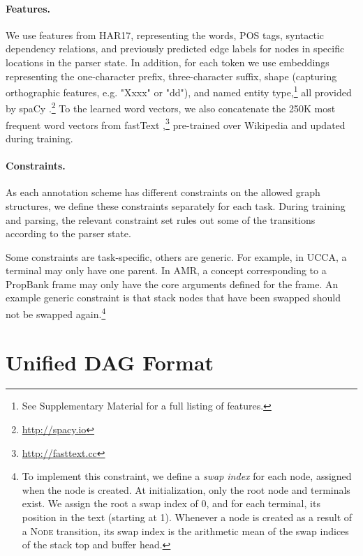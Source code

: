 \documentclass[11pt,a4paper]{article}
\begin{document}
\paragraph{Features.}
We use features from HAR17,
representing the words, POS tags, syntactic dependency relations, and previously predicted edge labels
for nodes in specific locations in the parser state.
In addition, for each token
we use embeddings representing the one-character prefix, three-character suffix,
shape (capturing orthographic features, e.g. "Xxxx" or "dd"),
and named entity type,\footnote{See Supplementary Material for a full listing of features.}
all provided by spaCy \cite{spacy2}.\footnote{\url{http://spacy.io}}
To the learned word vectors, we also concatenate the 250K most frequent word vectors from fastText
\cite{bojanowski2016enriching},\footnote{\url{http://fasttext.cc}}
pre-trained over Wikipedia and updated during training.


\paragraph{Constraints.}
As each annotation scheme has different constraints on the allowed graph structures,
we define these constraints separately for each task.
During training and parsing, the relevant constraint set rules out some of the transitions
according to the parser state.


Some constraints are task-specific, others are generic.
For example, in UCCA, a terminal may only have one parent.
In AMR, a concept corresponding to a PropBank frame may only have 
the core arguments defined for the frame.
An example generic constraint is that stack nodes 
that have been swapped
should not be swapped again.\footnote{
 To implement this constraint, we define a \textit{swap index}
 for each node, assigned when the node is created.
 At initialization, only the root node and terminals exist.
 We assign the root a swap index of 0, and for each terminal, its
 position in the text (starting at 1).
 Whenever a node is created as a result of a \textsc{Node}
 transition, its swap index is the arithmetic
 mean of the swap indices of the stack top and buffer head.}


\section{Unified DAG Format}\label{sec:format}
\end{document}
